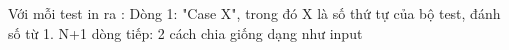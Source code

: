 Với mỗi test in ra : Dòng 1: "Case X", trong đó X là số thứ tự của bộ test, đánh số từ 1. N+1 dòng tiếp: 2 cách chia giống dạng như input

\